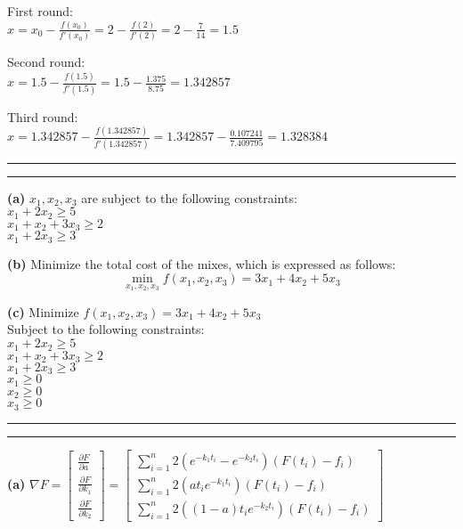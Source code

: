 \documentclass[11pt,letterpaper]{article}
\newcommand{\question}[1] {\vspace{.25in} \hrule\vspace{0.5em}
\noindent{\bf #1} \vspace{0.5em}
\hrule \vspace{.10in}}
\renewcommand{\part}[1] {\vspace{.10in} {\bf (#1)}}
\begin{document}
\newcommand{\newtx}[1]{#1 - \frac{f(#1)}{f'(#1)}}
\newcommand{\newtxx}[3]{#1 - \frac{#2}{#3}}
First round:\\
$x = \newtx{{x_0}} = \newtx{2} = \newtxx{2}{7}{14} = 1.5$

Second round:\\
$x =  \newtx{1.5} = \newtxx{1.5}{1.375}{8.75} = 1.342857$

Third round:\\
$x = \newtx{1.342857} = \newtxx{1.342857}{0.107241}{7.409795} = 1.328384$


\question{3}
\part{a}
$x_1, x_2, x_3$ are subject to the following constraints:\\
$x_1 + 2x_2 \geq 5$\\
$x_1 + x_2 + 3x_3 \geq 2$\\
$x_1 + 2x_3 \geq 3$

\part{b}
Minimize the total cost of the mixes, which is expressed as follows:
$$\min_{x_1, x_2, x_3} f(x_1, x_2, x_3) = 3x_1 + 4x_2 + 5x_3$$

\part{c}
Minimize $f(x_1, x_2, x_3) = 3x_1 + 4x_2 + 5x_3$\\
Subject to the following constraints:\\
$x_1 + 2x_2 \geq 5$\\
$x_1 + x_2 + 3x_3 \geq 2$\\
$x_1 + 2x_3 \geq 3$\\
$x_1 \geq 0$\\
$x_2 \geq 0$\\
$x_3 \geq 0$\\

\question{4}

\part{a}
$\nabla F = \begin{bmatrix}
\frac{\partial F}{\partial a}\\
\frac{\partial F}{\partial k_1}\\
\frac{\partial F}{\partial k_2}
\end{bmatrix}
=
\begin{bmatrix}
\sum_{i=1}^{n} 2(e^{-k_{1}t_i} - e^{-k_{2}t_i})(F(t_i) - f_i)\\
\sum_{i=1}^{n} 2(at_{i}e^{-k_{1}t_i})(F(t_i) - f_i)\\
\sum_{i=1}^{n} 2((1-a)t_{i}e^{-k_{2}t_i})(F(t_i) - f_i)
\end{bmatrix}$
\end{document}
